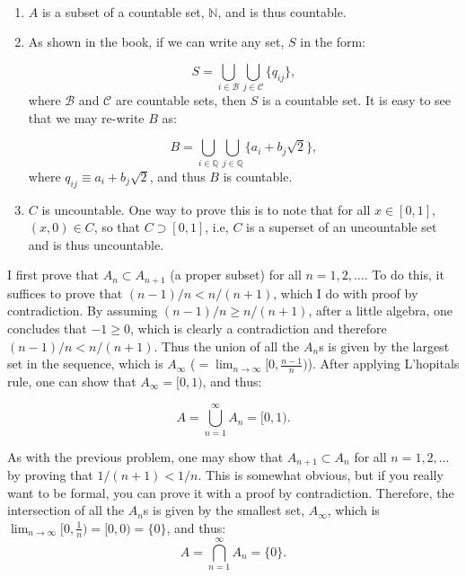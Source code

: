\begin{problem}{7} $ $
	\begin{enumerate}
		
		\item $A$ is a subset of a countable set, $\mathbb N$, and is thus countable.
		
		\item As shown in the book, if we can write any set, $S$ in the form:
		
		\begin{equation}
		S = \bigcup_{i \in \mathcal{B}} \bigcup_{j \in \mathcal C}  \{ q_{ij} \},
		\end{equation}
		where $\mathcal B$ and $\mathcal C$ are countable sets, then $S$ is a countable set.  It is easy to see that we may re-write $B$ as:
		
		\begin{equation}
		B = \bigcup_{i \in \mathbb Q} \bigcup_{j \in \mathbb Q}  \{ a_i +b_j \sqrt{2}\},
		\end{equation}
		where $q_{ij} \equiv a_i +b_j \sqrt{2}$, and thus $B$ is countable.
		
		
		\item $C$ is uncountable.  One way to prove this is to note that for all $x\in [0, 1]$, $(x, 0) \in C$, so that $C \supset [0, 1]$, i.e, $C$ is a superset of an uncountable set and is thus uncountable.
  
 	\end{enumerate}
\end{problem} 


\begin{problem}{8} I first prove that $A_n \subset A_{n+1}$ (a proper subset) for all $n=1, 2, \ldots$.  To do this, it suffices to prove that $(n-1)/n < n/(n+1)$, which I do with proof by contradiction.  By assuming $(n-1)/n \ge n/(n+1)$, after a little algebra, one concludes that $-1 \ge 0$, which is clearly a contradiction and therefore $(n-1)/n < n/(n+1)$. Thus the union of all the $A_n$s is given by the largest set in the sequence, which is $A_\infty$ ($=\lim_{n \rightarrow \infty} [0, \frac{n-1}{n})$).  After applying L'hopitals rule, one can show that $A_\infty = [0, 1)$, and thus:

	\begin{equation}
		A = \bigcup_{n=1}^{\infty} A_n = [0, 1) \nonumber .
	\end{equation}

  \end{problem} 
  
  
  \begin{problem}{9} As with the previous problem, one may show that $A_{n+1} \subset A_{n}$ for all $n=1, 2, \ldots$ by proving that $1/(n+1)<1/n$.  This is somewhat obvious, but if you really want to be formal, you can prove it with a proof by contradiction.  Therefore, the intersection of all the $A_n$s is given by the smallest set, $A_\infty$, which is $\lim_{n \rightarrow \infty} [0, \frac{1}{n}) = [0, 0) = \{ 0\}$, and thus:
	\begin{equation}
		A = \bigcap_{n=1}^{\infty} A_n = \{ 0\} \nonumber .
	\end{equation}
  \end{problem} 
  
